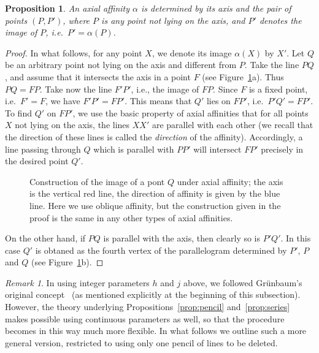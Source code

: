 \documentclass[reqno,12pt]{amsart}
\theoremstyle{plain}
\newtheorem{prop}[theorem]{Proposition}
\theoremstyle{definition}
\theoremstyle{remark}
\newtheorem{remark}{Remark}
\begin{document}
\begin{prop} \label{prop:determined}
An axial affinity $\alpha$ is determined by its axis and the pair of points $(P,P')$, where $P$ is any point not lying on the axis,
and $P'$ denotes the image of $P$, i.e.\ $P'=\alpha(P)$.
\end{prop}
%
\begin{proof}
In what follows, for any point $X$, we denote its image $\alpha(X)$ by $X'$. 
Let $Q$ be an arbitrary point not lying on the axis and different from $P$. 
Take the line $PQ$, and assume that it intersects the axis in a point $F$
(see Figure~\ref{fig:AffineConstr}a).
Thus $PQ=FP$. Take now the line $F'P'$, i.e., the image of $FP$. Since $F$ 
is a fixed point, i.e.\ $F'=F$, we have $F'P'=FP'$. This means that $Q'$ lies 
on $FP'$, i.e.\ $P'Q'=FP'$. To find $Q'$ on $FP'$, we use the basic property 
of axial affinities that for all points $X$ not lying on the axis, the lines $XX'$
are parallel with each other (we recall that the direction of these lines is called 
the \emph{direction} of the affinity). Accordingly, a line passing through $Q$
which is parallel with $PP'$ will intersect $FP'$ precisely in the desired point 
$Q'$.

\begin{figure}[h!]
\begin{center}
 \hskip 20pt
\caption{Construction of the image of a pont $Q$ under axial affinity; the axis is the vertical red line, the direction of affinity is given 
by the blue line. Here we use oblique affinity, but the construction given in the proof is the same in any other types of axial 
affinities.}
\label{fig:AffineConstr}
\end{center}
\end{figure}

On the other hand, if $PQ$ is parallel with the axis, then clearly so is $P'Q'$. 
In this case $Q'$ is obtaned as the fourth vertex of the parallelogram determined 
by $P'$, $P$ and $Q$ (see Figure~\ref{fig:AffineConstr}b).
\end{proof}

\begin{remark}
In using integer parameters $h$ and $j$ above, we followed Gr\"unbaum's original concept~\cite{Gru2009b} (as mentioned 
explicitly at the beginning of this subsection). However, the theory underlying Propositions~\ref{prop:pencil} and~\ref{prop:series} 
makes possible using continuous parameters as well, so that the procedure becomes in this way much more flexible. In what follows
we outline such a more general version, restricted to using only one pencil of lines to be deleted. 
\end{remark}
\end{document}
